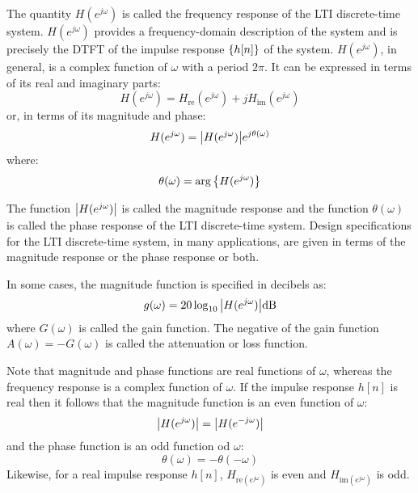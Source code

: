 \documentclass[../../main/main.tex]{subfiles}
\begin{document}
The quantity \( H(e^{j\omega}) \) is called the frequency response of the LTI discrete-time system. \( H(e^{j\omega}) \) provides a frequency-domain description of the system and is precisely the DTFT of the impulse response \( \qty{h[n]} \) of the system.
\( H(e^{j\omega}) \), in general, is a complex function of \( \omega \) with a period \( 2\pi \). It can be expressed in terms of its real and imaginary parts:
\begin{equation}
    H(e^{j\omega})
    =
    H_{\mathrm{re}}(e^{j\omega}) + j H_{\mathrm{im}}(e^{j\omega})
    \label{eq:L09_S36_1}
\end{equation}
or, in terms of its magnitude and phase:
\begin{equation}
    H(e^{j\omega})
    =
    \abs{H(e^{j\omega})} e^{j\theta(\omega)}
    \label{eq:L09_S36_2}
\end{equation}
where:
\begin{equation}
    \theta(\omega)
    =
    \arg\qty{H(e^{j\omega})}
    \label{eq:L09_S36_3}
\end{equation}

The function \( \abs{H(e^{j\omega})} \) is called the magnitude response and the function \( \theta(\omega) \) is called the phase response of the LTI discrete-time system. Design specifications for the LTI discrete-time system, in many applications, are given in terms of the magnitude response or the phase response or both.

In some cases, the magnitude function is specified in decibels as:
\begin{equation}
    g(\omega)
    =
    20 \log_{10} \abs{H(e^{j\omega})} \si{dB}
    \label{eq:L09_S38_1}
\end{equation}
where \( G(\omega) \) is called the gain function. The negative of the gain function \( A(\omega) = - G(\omega) \) is called the attenuation or loss function.

Note that magnitude and phase functions are real functions of \( \omega \), whereas the frequency response is a complex function of \( \omega \). If the impulse response \( h[n] \) is real then it follows that the magnitude function is an even function of \( \omega \):
\begin{equation}
    \abs{H(e^{j\omega})}
    =
    \abs{H(e^{-j\omega})}
    \label{eq:L09_S39_1}
\end{equation}
and the phase function is an odd function od \( \omega \):
\begin{equation}
    \theta(\omega)
    =
    - \theta(-\omega)
    \label{eq:L09_S39_2}
\end{equation}
Likewise, for a real impulse response \( h[n] \), \( H_{\mathrm{re}(e^{j\omega})} \) is even and \( H_{\mathrm{im}(e^{j\omega})} \) is odd.
\end{document}
